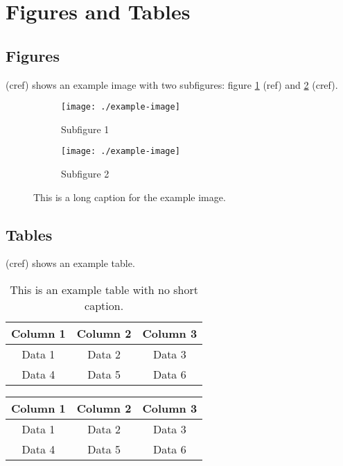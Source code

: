 \documentclass{article}
\begin{document}
\section{Figures and Tables\label{sec:figures_tables}}

\subsection{Figures}
 (cref) shows an example image with two subfigures: figure \ref{fig:subfig1} (ref) and \cref{fig:subfig2} (cref).

\begin{figure}[H]
    \begin{subfigure}[b]{0.5\textwidth}
        \centering
        \texttt{[image: ./example-image]}
        \caption{Subfigure 1}
        \label{fig:subfig1}
    \end{subfigure}
    \begin{subfigure}[b]{0.5\textwidth}
        \centering
        \texttt{[image: ./example-image]}
        \caption{Subfigure 2}
        \label{fig:subfig2}
    \end{subfigure}
    \caption[short caption]{This is a long caption for the example image.}
    \label{fig:example}
\end{figure}

\subsection{Tables}
 (cref) shows an example table.

\begin{table}[H]
    \centering
    \begin{tabular}{|c|c|c|}
        \hline
        Column 1 & Column 2 & Column 3 \\
        \hline
        Data 1 & Data 2 & Data 3 \\
        Data 4 & Data 5 & Data 6 \\
        \hline
    \end{tabular}
    \caption{This is an example table with no short caption.}
    \label{tab:example}
\end{table}

\begin{table}[H]
    \centering
    \begin{tabular}{|c|c|c|}
        \hline
        Column 1 & Column 2 & Column 3 \\
        \hline
        Data 1 & Data 2 & Data 3 \\
        Data 4 & Data 5 & Data 6 \\
        \hline
    \end{tabular}
\end{table}
\end{document}
